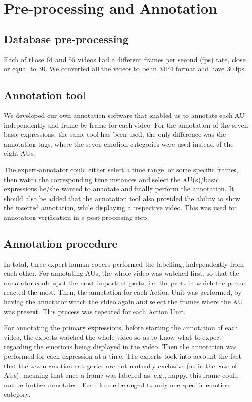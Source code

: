 \documentclass[a4paper, 10pt, conference]{ieeeconf}      %
\begin{document}
\section{Pre-processing and Annotation}

\subsection{Database pre-processing}

Each of those $64$ and $55$ videos had a different frames per second (fps) rate, close or equal to 30. We converted all the videos to be in MP4 format and have 30 fps.

\subsection{Annotation tool}

We developed our own annotation software that enabled us to annotate each AU independently and frame-by-frame for each video.
For the annotation of the seven basic expressions, the same tool has been used; the only difference was the annotation tags, where the seven emotion categories were used instead of the eight AUs.

The expert-annotator could either select a time range, or some specific frames, then watch the corresponding time instances and select the AU(s)/basic expressions he/she wanted to annotate and finally perform the annotation. It should also be added that the annotation tool  also provided the ability to show the inserted annotation, while displaying a respective video. This was used for annotation verification in a post-processing step.


\subsection{Annotation procedure}

In total, three expert human coders performed the labelling, independently from each other. 
For annotating AUs, the whole video was watched first, so that the annotator could spot the most important parts, i.e. the parts in which the person reacted the most. Then, the annotation for each Action Unit was performed, by having the annotator watch the video again and select the frames where the AU was present. This process was repeated for each Action Unit.

For annotating the primary expressions, before starting the annotation of each video, the experts watched the whole video so as to know what to expect regarding the emotions being displayed in the video. Then the annotation was performed for each expression at a time. The experts took into account the fact that the seven emotion categories are not mutually exclusive (as in the case of AUs), meaning that once a frame was labelled as, e.g., happy, this frame could not be further annotated. Each frame belonged to only one specific emotion category. 
\end{document}

